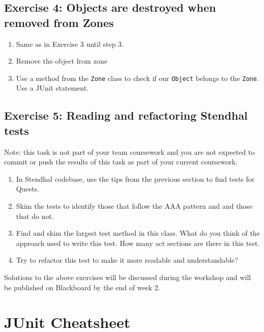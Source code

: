 \documentclass[
]{book}
\providecommand{\tightlist}{%
  \setlength{\itemsep}{0pt}\setlength{\parskip}{0pt}}
\begin{document}
\hypertarget{exercise-4-objects-are-destroyed-when-removed-from-zones}{%
\subsection{Exercise 4: Objects are destroyed when removed from Zones}\label{exercise-4-objects-are-destroyed-when-removed-from-zones}}

\begin{enumerate}
\def\labelenumi{\arabic{enumi}.}
\tightlist
\item
  Same as in Exercise 3 until step 3.
\item
  Remove the object from zone
\item
  Use a method from the \texttt{Zone} class to check if our \texttt{Object} belongs to the \texttt{Zone}. Use a JUnit statement.
\end{enumerate}

\hypertarget{exercise-5-reading-and-refactoring-stendhal-tests}{%
\subsection{Exercise 5: Reading and refactoring Stendhal tests}\label{exercise-5-reading-and-refactoring-stendhal-tests}}

Note: this task is not part of your team coursework and you are not expected to commit or push the results of this task as part of your current coursework.

\begin{enumerate}
\def\labelenumi{\arabic{enumi}.}
\tightlist
\item
  In Stendhal codebase, use the tips from the previous section to find tests for Quests.
\item
  Skim the tests to identify those that follow the AAA pattern and and those that do not.
\item
  Find and skim the largest test method in this class. What do you think of the approach used to write this test. How many act sections are there in this test.
\item
  Try to refactor this test to make it more readable and understandable?
\end{enumerate}

Solutions to the above exercises will be discussed during the workshop and will be published on Blackboard by the end of week 2.

\hypertarget{junit-cheatsheet}{%
\section{JUnit Cheatsheet}\label{junit-cheatsheet}}
\end{document}
